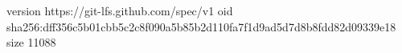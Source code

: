 version https://git-lfs.github.com/spec/v1
oid sha256:dff356c5b01cbb5c2c8f090a5b85b2d110fa7f1d9ad5d7d8b8fdd82d09339e18
size 11088
